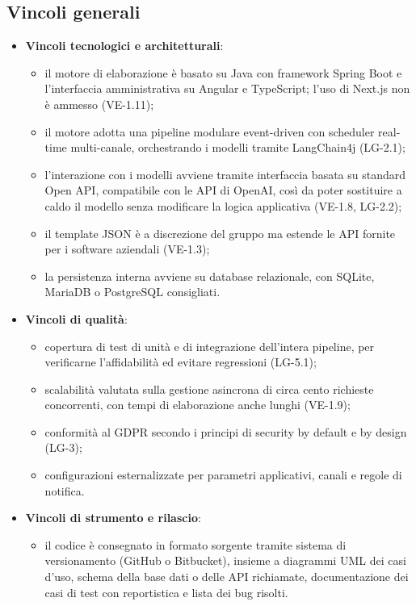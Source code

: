 \subsection{Vincoli generali}
	\begin{itemize}
		\item \textbf{Vincoli tecnologici e architetturali}:
			\begin{itemize}
				\item il motore di elaborazione è basato su Java con framework Spring Boot e l'interfaccia amministrativa su Angular e TypeScript; l'uso di Next.js non è ammesso (VE-1.11);
				\item il motore adotta una pipeline modulare event-driven con scheduler real-time multi-canale, orchestrando i modelli tramite LangChain4j (LG-2.1);
				\item l'interazione con i modelli avviene tramite interfaccia basata su standard Open API, compatibile con le API di OpenAI, così da poter sostituire a caldo il modello senza modificare la logica applicativa (VE-1.8, LG-2.2);
				\item il template JSON è a discrezione del gruppo ma estende le API fornite per i software aziendali (VE-1.3);
				\item la persistenza interna avviene su database relazionale, con SQLite, MariaDB o PostgreSQL consigliati.
			\end{itemize}
		\item \textbf{Vincoli di qualità}:
			\begin{itemize}
				\item copertura di test di unità e di integrazione dell'intera pipeline, per verificarne l'affidabilità ed evitare regressioni (LG-5.1);
				\item scalabilità valutata sulla gestione asincrona di circa cento richieste concorrenti, con tempi di elaborazione anche lunghi (VE-1.9);
				\item conformità al GDPR secondo i principi di security by default e by design (LG-3);
				\item configurazioni esternalizzate per parametri applicativi, canali e regole di notifica.
			\end{itemize}
		\item \textbf{Vincoli di strumento e rilascio}:
			\begin{itemize}
				\item il codice è consegnato in formato sorgente tramite sistema di versionamento (GitHub o Bitbucket), insieme a diagrammi UML dei casi d'uso, schema della base dati o delle API richiamate, documentazione dei casi di test con reportistica e lista dei bug risolti.
			\end{itemize}
	\end{itemize}

